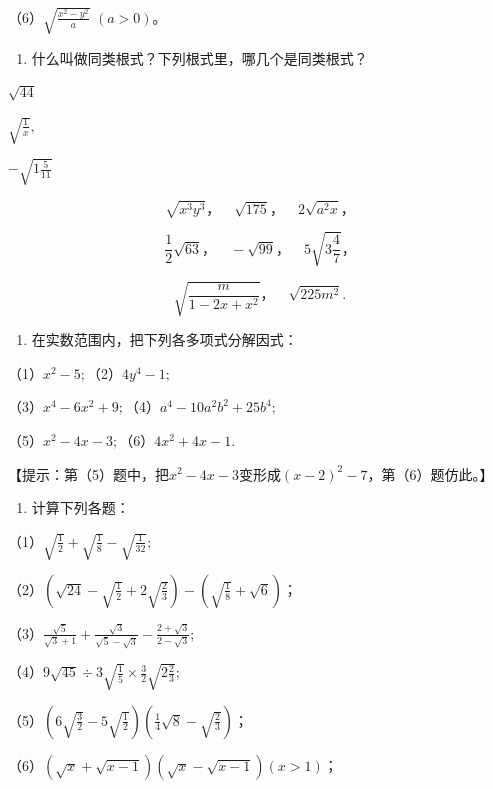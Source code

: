 （6）\(\sqrt{\frac{x^2 - y^2}{a}}\) \((a > 0)\)。

\begin{enumerate}[start=9]
\item
  什么叫做同类根式？下列根式里，哪几个是同类根式？
\end{enumerate}

\(\sqrt{44}\)

\(\sqrt{\frac{1}{x}},\)

\(-\sqrt{1\frac{5}{11}}\)

\[
\sqrt {x ^ {3} y ^ {3}}\text{，} \quad \sqrt {175}\text{，} \quad 2 \sqrt {a ^ {2} x}\text{，}
\]

\[
\frac{1}{2} \sqrt {63}\text{，} \quad - \sqrt {99}\text{，} \quad 5 \sqrt {3 \frac{4}{7}}\text{，}
\]

\[
\sqrt {\frac{m}{1 - 2 x + x ^ {2}}}\text{，} \quad \sqrt {225 m ^ {2}}.
\]

\begin{enumerate}[start=10]
\item
  在实数范围内，把下列各多项式分解因式：
\end{enumerate}

（1）\(x^{2} - 5;\)（2）\(4y^{4} - 1;\)

（3）\(x^{4} - 6x^{2} + 9;\)（4）\(a^4 -10a^2 b^2 +25b^4;\)

（5）\(x^{2} - 4x - 3;\)（6）\(4x^{2} + 4x - 1.\)

【提示：第（5）题中，把\(x^{2} - 4x - 3\)变形成\((x - 2)^{2} - 7\)，第（6）题仿此。】

\begin{enumerate}[start=11]
\item
  计算下列各题：
\end{enumerate}

（1）\(\sqrt{\frac{1}{2}} + \sqrt{\frac{1}{8}} - \sqrt{\frac{1}{32}};\)

（2）\(\left(\sqrt{24} - \sqrt{\frac{1}{2}} + 2\sqrt{\frac{2}{3}}\right) - \left(\sqrt{\frac{1}{8}} + \sqrt{6}\right)\)；

（3）\(\frac{\sqrt{5}}{\sqrt{3} + 1} + \frac{\sqrt{3}}{\sqrt{5} - \sqrt{3}} - \frac{2 + \sqrt{3}}{2 - \sqrt{3}};\)

（4）\(9\sqrt{45} \div 3\sqrt{\frac{1}{5}} \times \frac{3}{2}\sqrt{2\frac{2}{3}};\)

（5）\(\left(6\sqrt{\frac{3}{2}} - 5\sqrt{\frac{1}{2}}\right)\left(\frac{1}{4}\sqrt{8} - \sqrt{\frac{2}{3}}\right)\)；

（6）\((\sqrt{x} + \sqrt{x - 1})(\sqrt{x} - \sqrt{x - 1})(x > 1)\)；

